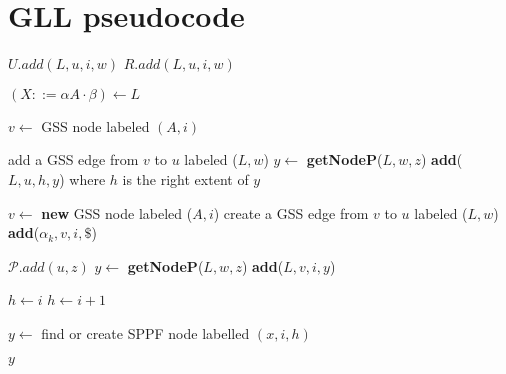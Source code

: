 \appendix

\section{GLL pseudocode}\label{GLLCode}
\begin{algorithmic}
    \State $U.add(L,u,i,w)$
    \State $R.add(L,u,i,w)$
    \EndIf
    \EndFunction
\end{algorithmic}

\begin{algorithmic}    
    \State $(X ::= \alpha A \cdot \beta) \gets L$
    
    \State $v \gets$ GSS node labeled $(A, i)$
    
    \State add a GSS edge from $v$ to $u$ labeled ($L,w$)
    \State $y \gets$ \textbf{getNodeP}($L,w,z$)
    \State \textbf{add}($L, u, h, y$) where $h$ is the right extent of $y$
    \EndFor
    \EndIf
    
    \Else
    \State $v \gets$ \textbf{new} GSS node labeled ($A, i$)
    \State create a GSS edge from $v$ to $u$ labeled ($L, w$)
    \State \textbf{add}($\alpha_{k}, v, i, \$ $)
    \EndFor
    \EndIf
    \EndFunction
\end{algorithmic}

\begin{algorithmic}   
    \State $\mathcal{P}.add(u,z)$
    \State $y \gets$ \textbf{getNodeP}($L, w, z$)
    \State \textbf{add}($L,v,i,y$)
    \EndFor
    \EndIf
    \EndFunction
\end{algorithmic}

\begin{algorithmic}   
    \State $h \gets i$
    \Else
    \State $h \gets i + 1$
    \EndIf
    
    \State $y \gets$ find or create SPPF node labelled $(x, i, h)$
    
    \Return $y$
    
    \EndFunction
\end{algorithmic}


